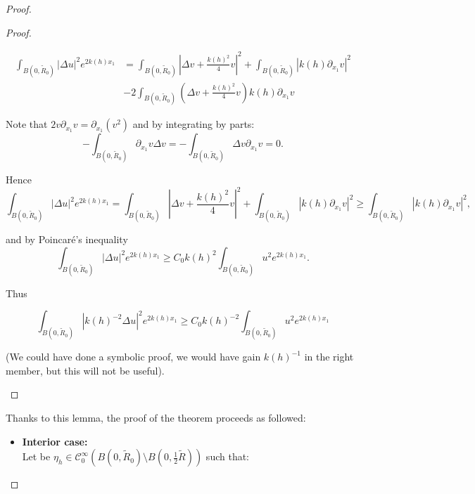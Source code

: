 \documentclass[leqno,11pt,letterpaper, english]{amsart}
\newcommand{\nn}{\nonumber}
\theoremstyle{plain}
\theoremstyle{definition}
\numberwithin{equation}{section}
\begin{document}
\begin{proof}
\begin{proof}
\begin{itemize}
				\begin{align}
					\int_{B(0,\tilde{R}_0)} |\Delta u|^2e^{2k(h)x_1}&=\int_{B(0,\tilde{R}_0)} |\Delta v +\frac{k(h)^2}{4}v|^2+\int_{B(0,\tilde{R}_0)} |k(h)\partial_{x_1}v|^2\nn\\
					&-2\int_{B(0,\tilde{R}_0)} (\Delta v +\frac{k(h)^2}{4}v)k(h)\partial_{x_1}v
				\end{align}
				
				Note that $2v\partial_{x_1}v= \partial_{x_1}(v^2)$ and by integrating by parts:
				\begin{equation}
					-\int_{B(0,\tilde{R}_0)} \partial_{x_1}v \Delta v= -\int_{B(0,\tilde{R}_0)} \Delta v \partial_{x_1}v=0.
				\end{equation}
				
				Hence
				\begin{equation}
					\int_{B(0,\tilde{R}_0)} |\Delta u|^2e^{2k(h)x_1}=\int_{B(0,\tilde{R}_0)} |\Delta v +\frac{k(h)^2}{4}v|^2+\int_{B(0,\tilde{R}_0)} |k(h)\partial_{x_1}v|^2\geq \int_{B(0,\tilde{R}_0)} |k(h)\partial_{x_1}v|^2,
				\end{equation}
				
				and by Poincaré’s inequality
				\begin{equation}
					\int_{B(0,\tilde{R}_0)} |\Delta u|^2e^{2k(h)x_1}\geq C_0 k(h)^2 \int_{B(0,\tilde{R}_0)} u^2 e^{2k(h)x_1}.
				\end{equation}
				
				Thus
				
				\begin{equation}
					\int_{B(0,\tilde{R}_0)} |k(h)^{-2}\Delta u|^2e^{2k(h)x_1}\geq C_0 k(h)^{-2} \int_{B(0,\tilde{R}_0)} u^2 e^{2k(h)x_1}
				\end{equation}
				
				(We could have done a symbolic proof, we would have gain $k(h)^{-1}$ in the right member, but this will not be useful).
			\end{itemize}
		\end{proof}

Thanks to this lemma, the proof of the theorem proceeds as followed: 
		\begin{itemize}
			\item \textbf{Interior case:}\\
			Let be $\eta_h \in \mathcal{C}_0^\infty(B(0,\tilde{R}_0)\setminus B(0,\frac{1}{2}\tilde{R}))$ such that:
			

\end{itemize}
\end{proof}
\end{document}
